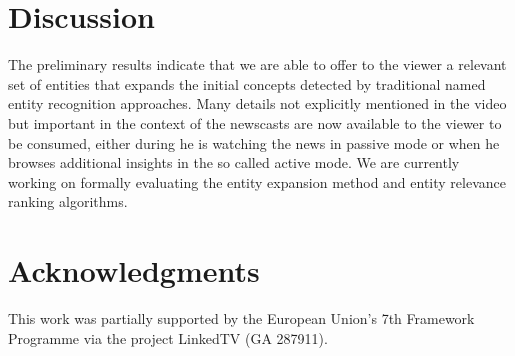 \documentclass{llncs}
\begin{document}

\section{Discussion}
\label{sec:discussion}
The preliminary results indicate that we are able to offer to the viewer a relevant set of entities that expands the initial concepts detected by traditional named entity recognition approaches. Many details not explicitly mentioned in the video but important in the context of the newscasts are now available to the viewer to be consumed, either during he is watching the news in passive mode or when he browses additional insights in the so called active mode. We are currently working on formally evaluating the entity expansion method and entity relevance ranking algorithms.




\section*{Acknowledgments}
This work was partially supported by the European Union's 7th Framework Programme via the project LinkedTV (GA 287911).



\end{document}
